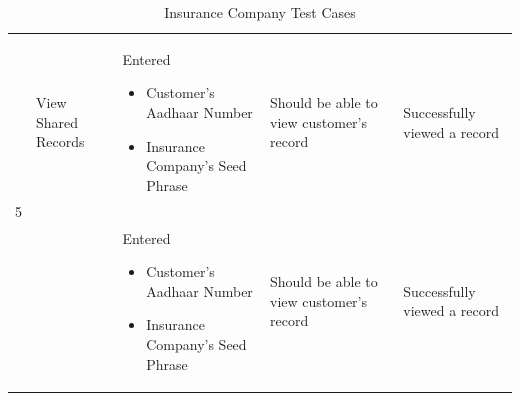 \begin{table}[h!]
\begin{tabular}{|p{.65cm}|p{2.5cm}|p{4cm}|p{3cm}|p{3.5cm}|}
		\multirow{2}{1em}{\scriptsize 5} &{\scriptsize View Shared Records}& \scriptsize  Entered\scriptsize
		\begin{itemize}
		 \vspace{-5mm}
		    \item Customer's Aadhaar Number \vspace{-5mm}
		    \item Insurance Company's Seed Phrase\vspace{-5mm}
		\end{itemize} & \scriptsize Should be able to view customer's record& \scriptsize Successfully viewed a record \\
		& & \scriptsize \vspace{-5mm}Entered  \begin{itemize}
		 \vspace{-5mm}
		    \item Customer's Aadhaar Number \vspace{-5mm}
		    \item Insurance Company's Seed Phrase\vspace{-5mm}
		\end{itemize} & \scriptsize Should be able to view customer's record& \scriptsize Successfully viewed a record\\
		 
		\hline
	\end{tabular}
	\caption{Insurance Company Test Cases}
\end{table}

